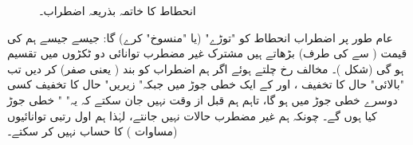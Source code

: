 \begin{figure}
\centering
{}
\caption{انحطاط کا خاتمہ بذریعہ اضطراب۔}
\label{شکل_غیر_تابع_اضطراب_اختتام_انحطاط}
\end{figure}


عام طور پر اضطراب  انحطاط کو "توڑے"  (یا "منسوخ" کرے) گا:  جیسے جیسے ہم  کی قیمت (  سے   کی طرف) بڑھاتے ہیں مشترک غیر مضطرب توانائی  دو ٹکڑوں میں تقسیم ہو گی   (شکل  )۔ مخالف رخ  چلتے ہوئے اگر ہم اضطراب کو بند (  یعنی صفر)  کر دیں تب "بالائی"  حال کا تخفیف ،   اور  کے  ایک خطی جوڑ میں  جبکہ" زیریں" حال کا تخفیف کسی دوسرے   خطی جوڑ میں ہو گا،   تاہم ہم قبل از وقت نہیں جان سکتے  کہ یہ" " خطی جوڑ کیا ہوں گے۔ چونکہ ہم غیر مضطرب حالات نہیں جانتے،   لہٰذا    ہم اول رتبی توانائیوں  (مساوات  ) کا حساب نہیں کر سکتے۔ 

